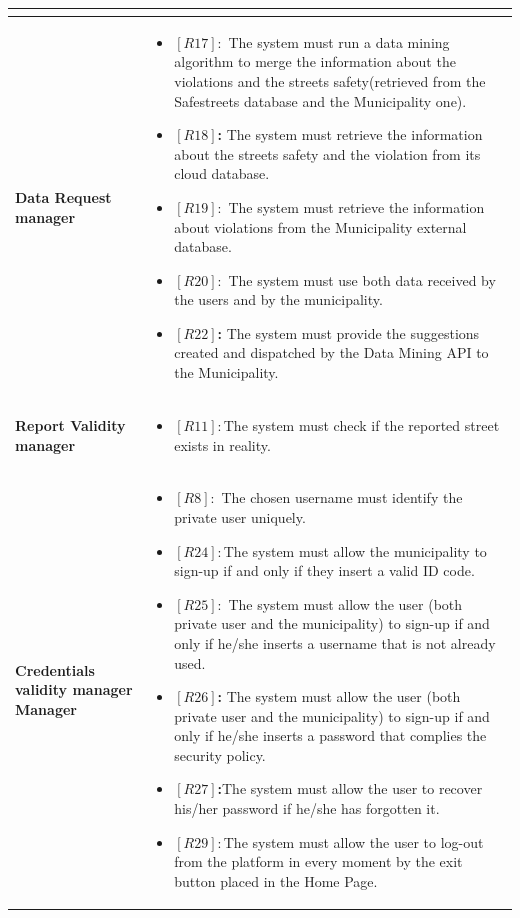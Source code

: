 \documentclass[titlepage]{article}
\begin{document}
\begin{longtable}{| p{4 cm} | p{11.5 cm} |}
\begin{itemize}
		\end{itemize} \\ \hline
		\newline \textbf {Data Request manager} &
		\begin{itemize}
			\item \textbf{$[R17]:$} The system must run a data mining algorithm to merge the
information about the violations and the streets safety(retrieved from
the Safestreets database and the Municipality one).
			\item \textbf{$[R18]$:} The system must retrieve the information about the streets
safety and the violation from its cloud database.
			\item \textbf{$[R19]:$} The system must retrieve the information about violations
from the Municipality external database.
			\item \textbf{$[R20]:$} The system must use both data received by the users and by the municipality.
			\item \textbf{$[R22]$:} The system must provide the suggestions created and dispatched
by the Data Mining API to the Municipality. 
		\end{itemize} \\ \hline
		\newline \textbf {Report Validity manager} &
		\begin{itemize}
			\item \textbf{$[R11]:$}The system must check if the reported street exists in reality.  
		\end{itemize} \\ \hline
		\newline \textbf {Credentials validity manager Manager} &
		\begin{itemize}
			\item \textbf{$[R8]:$} The chosen username must identify the private user uniquely. 
			\item \textbf{$[R24]:$}The system must allow the municipality to sign-up if and only if they insert a valid ID code. 
			\item \textbf{$[R25]:$} The system must allow the user (both private user and the municipality) to sign-up if and only if he/she inserts a username that is not already used.
			 \item \textbf{$[R26]$:} The system must allow the user (both private user and the municipality) to sign-up if and only if he/she inserts a password that complies the security policy. 
			 \item \textbf{$[R27]$:}The system must allow the user to recover his/her password if he/she has forgotten it. 
			 \item \textbf{$[R29]:$}The system must allow the user to log-out from the platform in every moment by the exit button placed in the Home Page. 
			 

\end{itemize}
\end{longtable}
\end{document}
